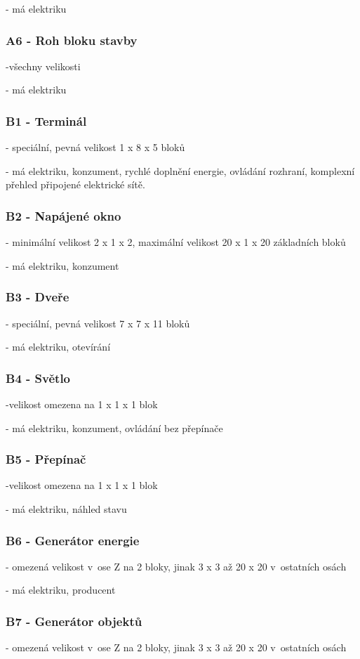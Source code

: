 - má elektriku
\subsubsection{A6 - Roh bloku stavby}
-všechny velikosti

- má elektriku

\subsubsection{B1 - Terminál}
- speciální, pevná velikost 1 x 8 x 5 bloků

- má elektriku, konzument, rychlé doplnění energie, ovládání rozhraní, komplexní přehled připojené elektrické sítě.
\subsubsection{B2 - Napájené okno}
- minimální velikost 2 x 1 x 2, maximální velikost 20 x 1 x 20 základních bloků

- má elektriku, konzument
\subsubsection{B3 - Dveře}
- speciální, pevná velikost 7 x 7 x 11 bloků

- má elektriku, otevírání
\subsubsection{B4 - Světlo}
-velikost omezena na 1 x 1 x 1 blok

- má elektriku, konzument, ovládání bez přepínače
\subsubsection{B5 - Přepínač}
-velikost omezena na 1 x 1 x 1 blok

- má elektriku, náhled stavu
\subsubsection{B6 - Generátor energie}
- omezená velikost v~ose Z na 2 bloky, jinak 3 x 3 až 20 x 20 v~ostatních osách

- má elektriku, producent
\subsubsection{B7 - Generátor objektů}
- omezená velikost v~ose Z na 2 bloky, jinak 3 x 3 až 20 x 20 v~ostatních osách

